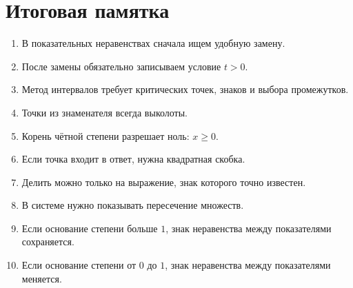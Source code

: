 \documentclass[a4paper,12pt]{article}
\begin{document}
\section*{Итоговая памятка}

\begin{enumerate}[label=\textbf{\arabic*.}, leftmargin=8mm]
\item В показательных неравенствах сначала ищем удобную замену.
\item После замены обязательно записываем условие \(t>0\).
\item Метод интервалов требует критических точек, знаков и выбора промежутков.
\item Точки из знаменателя всегда выколоты.
\item Корень чётной степени разрешает ноль: \(x\ge0\).
\item Если точка входит в ответ, нужна квадратная скобка.
\item Делить можно только на выражение, знак которого точно известен.
\item В системе нужно показывать пересечение множеств.
\item Если основание степени больше \(1\), знак неравенства между показателями сохраняется.
\item Если основание степени от \(0\) до \(1\), знак неравенства между показателями меняется.
\end{enumerate}
\end{document}
